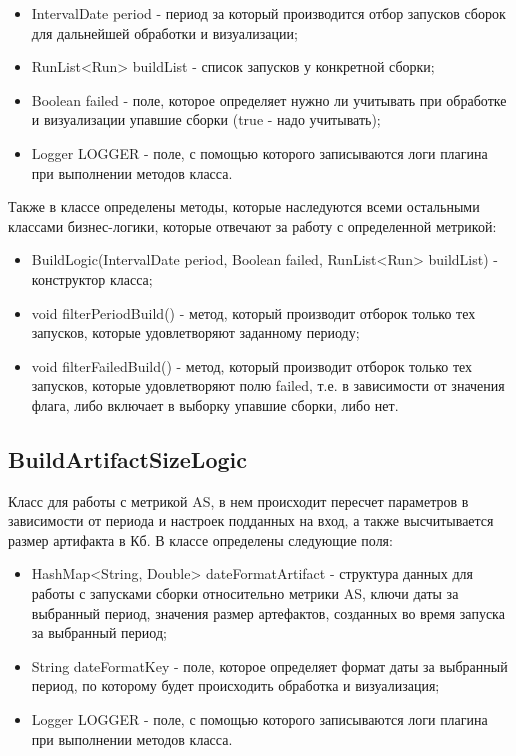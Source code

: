 \begin{itemize}
	\item IntervalDate period - период за который производится отбор запусков сборок для дальнейшей обработки и визуализации;
	\item RunList<Run> buildList - список запусков у конкретной сборки;
	\item Boolean failed - поле, которое определяет нужно ли учитывать при обработке и визуализации упавшие сборки (true - надо учитывать);
	\item Logger LOGGER - поле, с помощью которого записываются логи плагина при выполнении методов класса.
\end{itemize}

Также в классе определены методы, которые наследуются всеми остальными классами бизнес-логики, которые отвечают за работу с определенной метрикой:

\begin{itemize}
	\item BuildLogic(IntervalDate period, Boolean failed, RunList<Run> buildList) - конструктор класса;
	\item void filterPeriodBuild() - метод, который производит отборок только тех запусков, которые удовлетворяют заданному периоду;
	\item void filterFailedBuild() - метод, который производит отборок только тех запусков, которые удовлетворяют полю failed, т.е. в зависимости от значения флага, либо включает в выборку упавшие сборки, либо нет.
\end{itemize}

\subsection{BuildArtifactSizeLogic}

Класс для работы с метрикой AS, в нем происходит пересчет параметров в зависимости от периода и настроек подданных на вход, а также высчитывается размер артифакта в Кб. В классе определены следующие поля:

\begin{itemize}
	\item HashMap<String, Double> dateFormatArtifact - структура данных для работы с запусками сборки относительно метрики AS, ключи даты за выбранный период, значения размер артефактов, созданных во время запуска за выбранный период;
	\item String dateFormatKey - поле, которое определяет формат даты за выбранный период, по которому будет происходить обработка и визуализация;
	\item Logger LOGGER - поле, с помощью которого записываются логи плагина при выполнении методов класса.
\end{itemize}

